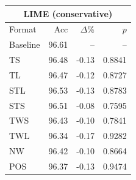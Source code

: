 \begin{tabular}{lrrr}
\toprule
\multicolumn{4}{c}{\textbf{LIME (conservative)}} \\
\midrule
Format & Acc & $\Delta$\% & $p$ \\
\midrule
Baseline & 96.61 & -- & -- \\
\midrule
TS & 96.48 & -0.13 & 0.8841 \\
TL & 96.47 & -0.12 & 0.8727 \\
STL & 96.53 & -0.13 & 0.8783 \\
STS & 96.51 & -0.08 & 0.7595 \\
TWS & 96.43 & -0.10 & 0.7841 \\
TWL & 96.34 & -0.17 & 0.9282 \\
NW & 96.42 & -0.10 & 0.8664 \\
POS & 96.37 & -0.13 & 0.9474 \\
\bottomrule
\end{tabular}